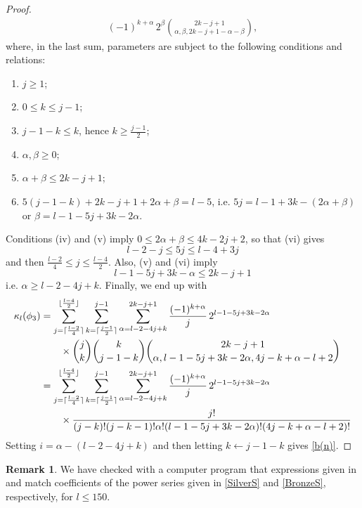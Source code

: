 \documentclass[11pt,reqno]{amsart}
\theoremstyle{plain}
\theoremstyle{definition}
\newtheorem{remarque}[lemme]{Remark}
\numberwithin{figure}{section}
\numberwithin{table}{section}
\numberwithin{equation}{section}
\newcommand\al{\alpha}
\newcommand\be{\beta}
\newcommand\ka{\kappa}
\let\fr=\frac
\DeclarePairedDelimiter{\ceil}{\lceil}{\rceil}%
\DeclarePairedDelimiter{\floor}{\lfloor}{\rfloor}%
\begin{document}
\begin{proof}
\begin{align*}
(-1)^{k+\al}\,2^\be\binom{2k-j+1}{\al,\be,2k-j+1-\al-\be},
\end{align*}
where, in the last sum, parameters are subject to the following conditions and relations:
\begin{enumerate}[label=(\roman*)]
\item $j≥1$;
\item $0≤k≤j-1$;
\item $j-1-k≤k$, hence $k≥{\fr{j-1}{2}}$;
\item $\al,\be≥0$;
\item $\al+\be≤2k-j+1$;
\item $5(j-1-k)+2k-j+1+2\al+\be=l-5$, i.e. $5j=l-1+3k-(2\al+\be)$ or $\be=l-1-5j+3k-2\al$.
\end{enumerate}
Conditions (iv) and (v) imply $0≤2\al+\be≤4k-2j+2$, so that (vi) gives
\begin{equation*}
l-2-j≤5j≤l-4+3j
\end{equation*}
and then $\fr{l-2}{4}≤j≤\fr{l-4}{2}$. Also, (v) and (vi) imply
\begin{equation*}
l-1-5j+3k-\al≤2k-j+1
\end{equation*}
i.e. $\al≥l-2-4j+k$. Finally, we end up with
\begin{align*}
\ka_l(\phi_3)&=\sum_{j=\ceil{\fr{l-2}{4}}}^{\floor{\fr{l-4}{2}}}\sum_{k=\ceil{\fr{j-1}{2}}}^{j-1}
\sum_{\al=l-2-4j+k}^{2k-j+1} \fr {(-1)^{k+\al}}{j}\,2^{l-1-5j+3k-2\al}\\
&\qquad
\times\binom{j}{k}\binom{k}{j-1-k}\binom{2k-j+1}{\al,l-1-5j+3k-2\al,4j-k+\al-l+2}\\
&=\sum_{j=\ceil{\fr{l-2}{4}}}^{\floor{\fr{l-4}{2}}}\sum_{k=\ceil{\fr{j-1}{2}}}^{j-1}
\sum_{\al=l-2-4j+k}^{2k-j+1} \fr {(-1)^{k+\al}}{j}\,2^{l-1-5j+3k-2\al}\\
&\qquad
\times\fr{j!}{(j-k)!(j-k-1)!\al!(l-1-5j+3k-2\al)!(4j-k+\al-l+2)!}
\end{align*}
Setting $i=\al-(l-2-4j+k)$ and then letting $k\leftarrow j-1-k$ gives \eqref{b(n)}.
\end{proof}

\begin{remarque}
We have checked with a computer program that expressions given in  and   match coefficients of the power series given in \eqref{SilverS} and \eqref{BronzeS}, respectively, for $l≤150$.
\end{remarque}
\end{document}
